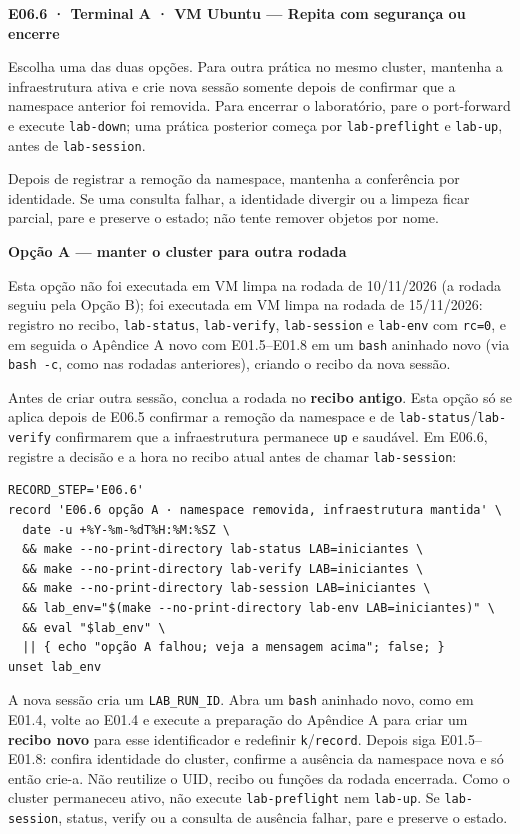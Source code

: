 \documentclass[12pt,openany,oneside,a4paper,chapter=TITLE,english,brazil]{abntex2}
\begin{document}
\textbf{E06.6 · Terminal A · VM Ubuntu --- Repita com segurança ou encerre}

Escolha uma das duas opções. Para outra prática no mesmo cluster, mantenha a infraestrutura ativa e crie nova sessão somente depois de confirmar que a namespace anterior foi removida. Para encerrar o laboratório, pare o port-forward e execute \texttt{lab-{}\allowbreak{}down}; uma prática posterior começa por \texttt{lab-{}\allowbreak{}preflight} e \texttt{lab-{}\allowbreak{}up}, antes de \texttt{lab-{}\allowbreak{}session}.

Depois de registrar a remoção da namespace, mantenha a conferência por identidade. Se uma consulta falhar, a identidade divergir ou a limpeza ficar parcial, pare e preserve o estado; não tente remover objetos por nome.

\textbf{Opção A --- manter o cluster para outra rodada}

Esta opção não foi executada em VM limpa na rodada de 10/11/2026 (a rodada seguiu pela Opção B); foi executada em VM limpa na rodada de 15/11/2026: registro no recibo, \texttt{lab-{}\allowbreak{}status}, \texttt{lab-{}\allowbreak{}verify}, \texttt{lab-{}\allowbreak{}session} e \texttt{lab-{}\allowbreak{}env} com \texttt{rc=\allowbreak{}0}, e em seguida o Apêndice A novo com E01.5--E01.8 em um \texttt{bash} aninhado novo (via \texttt{bash -{}\allowbreak{}c}, como nas rodadas anteriores), criando o recibo da nova sessão.

Antes de criar outra sessão, conclua a rodada no \textbf{recibo antigo}. Esta opção só se aplica depois de E06.5 confirmar a remoção da namespace e de \texttt{lab-{}\allowbreak{}status}/\texttt{lab-{}\allowbreak{}verify} confirmarem que a infraestrutura permanece \texttt{up} e saudável. Em E06.6, registre a decisão e a hora no recibo atual antes de chamar \texttt{lab-{}\allowbreak{}session}:

\begin{verbatim}
RECORD_STEP='E06.6'
record 'E06.6 opção A · namespace removida, infraestrutura mantida' \
  date -u +%Y-%m-%dT%H:%M:%SZ \
  && make --no-print-directory lab-status LAB=iniciantes \
  && make --no-print-directory lab-verify LAB=iniciantes \
  && make --no-print-directory lab-session LAB=iniciantes \
  && lab_env="$(make --no-print-directory lab-env LAB=iniciantes)" \
  && eval "$lab_env" \
  || { echo "opção A falhou; veja a mensagem acima"; false; }
unset lab_env
\end{verbatim}

A nova sessão cria um \texttt{LAB\_\allowbreak{}RUN\_\allowbreak{}ID}. Abra um \texttt{bash} aninhado novo, como em E01.4, volte ao E01.4 e execute a preparação do Apêndice A para criar um \textbf{recibo novo} para esse identificador e redefinir \texttt{k}/\texttt{record}. Depois siga E01.5--E01.8: confira identidade do cluster, confirme a ausência da namespace nova e só então crie-a. Não reutilize o UID, recibo ou funções da rodada encerrada. Como o cluster permaneceu ativo, não execute \texttt{lab-{}\allowbreak{}preflight} nem \texttt{lab-{}\allowbreak{}up}. Se \texttt{lab-{}\allowbreak{}session}, status, verify ou a consulta de ausência falhar, pare e preserve o estado.
\end{document}
